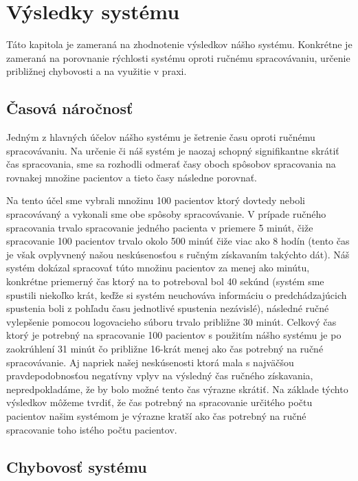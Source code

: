 \chapter{Výsledky systému}

Táto kapitola je zameraná na zhodnotenie výsledkov nášho systému. Konkrétne je zameraná na porovnanie rýchlosti systému oproti ručnému spracovávaniu, určenie približnej chybovosti a na využitie v praxi.

\section{Časová náročnosť}
\label{casNar}

Jedným z hlavných účelov nášho systému je šetrenie času oproti ručnému spracovávaniu. Na určenie či náš systém je naozaj schopný signifikantne skrátiť čas spracovania, sme sa rozhodli odmerať časy oboch spôsobov spracovania na rovnakej množine pacientov a tieto časy následne porovnať. 

Na tento účel sme vybrali množinu 100 pacientov ktorý dovtedy neboli spracovávaný a vykonali sme obe spôsoby spracovávanie. V prípade ručného spracovania trvalo spracovanie jedného pacienta v priemere 5 minút, čiže spracovanie 100 pacientov trvalo okolo 500 minúť čiže viac ako 8 hodín (tento čas je však ovplyvnený našou neskúsenosťou s ručným získavaním takýchto dát). Náš systém dokázal spracovať túto množinu pacientov za menej ako minútu, konkrétne priemerný čas ktorý na to potreboval bol 40 sekúnd (systém sme spustili niekoľko krát, keďže si systém neuchováva informáciu o predchádzajúcich spustenia boli z pohľadu času jednotlivé spustenia nezávislé), následné ručné vylepšenie pomocou logovacieho súboru trvalo približne 30 minút. Celkový čas ktorý je potrebný na spracovanie 100 pacientov s použitím nášho systému je po zaokrúhlení 31 minút čo približne 16-krát menej ako čas potrebný na ručné spracovávanie. Aj napriek našej neskúsenosti ktorá mala s najväčšou pravdepodobnosťou negatívny vplyv na výsledný čas ručného získavania, nepredpokladáme, že by bolo možné tento čas výrazne  skrátiť. Na základe týchto výsledkov môžeme tvrdiť, že čas potrebný na spracovanie určitého počtu pacientov našim systémom je výrazne kratší ako čas potrebný na ručné spracovanie toho istého počtu pacientov.

\section{Chybovosť systému}

